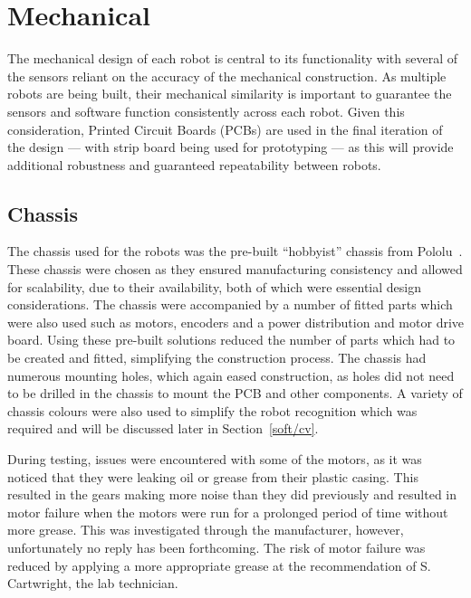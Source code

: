 
\chapter{Mechanical}\label{mechanical}

The mechanical design of each robot is central to its 
functionality with several of the sensors
reliant on the accuracy of the mechanical construction. As 
multiple robots are being built, 
their mechanical similarity is important to guarantee the 
sensors and software function consistently across each robot. 
Given this consideration, Printed Circuit Boards (PCBs) are used in 
the final iteration of the design --- with strip board being used for 
prototyping --- as this will provide additional robustness and 
guaranteed repeatability between robots.

\section{Chassis}\label{mech/chassis}
The chassis used for the robots was the pre-built ``hobbyist'' 
chassis from Pololu~\cite{pololuchassis}. These chassis were 
chosen as they ensured manufacturing consistency and allowed 
for scalability, due to their availability, both of which were 
essential design considerations. The chassis were accompanied by 
a number of fitted parts which were also used such as motors, 
encoders and a power distribution and motor drive board. Using these pre-built 
solutions reduced the number of parts which had to be created 
and fitted, simplifying the construction process.
The chassis had numerous mounting holes, which again eased 
construction, as holes did not need to be drilled in the chassis 
to mount the PCB and other components. A variety of chassis 
colours were also used to simplify the robot recognition which 
was required and will be discussed later in Section~\ref{soft/cv}. 

During testing, issues were encountered with some of the motors, 
as it was noticed that they 
were leaking oil or grease from their plastic casing. This 
resulted in the gears making more noise than they did previously 
and resulted in motor failure when the motors were run for a 
prolonged period of time without more grease. This was 
investigated through the manufacturer, however, unfortunately no 
reply has been forthcoming. The risk of motor failure was 
reduced by applying a more appropriate grease at the 
recommendation of S. Cartwright, the lab technician.  

